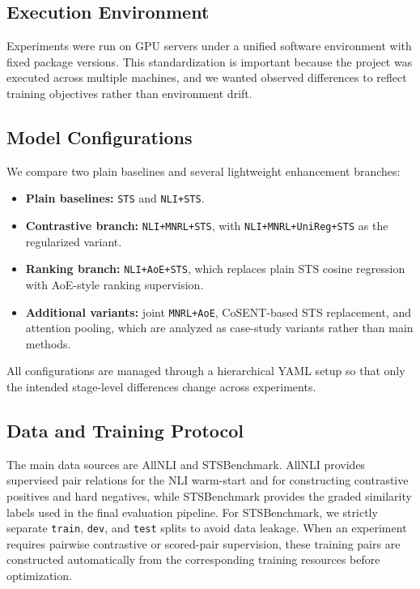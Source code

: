 \documentclass[letterpaper]{article} %
\begin{document}
\subsection{Execution Environment}
Experiments were run on GPU servers under a unified software environment with fixed package
versions. This standardization is important because the project was executed across multiple
machines, and we wanted observed differences to reflect training objectives rather than environment
drift.

\subsection{Model Configurations}
We compare two plain baselines and several lightweight enhancement branches:
\begin{itemize}[itemsep=0pt]
    \item \textbf{Plain baselines:} \texttt{STS} and \texttt{NLI+STS}.
    \item \textbf{Contrastive branch:} \texttt{NLI+MNRL+STS}, with \texttt{NLI+MNRL+UniReg+STS} as the regularized variant.
    \item \textbf{Ranking branch:} \texttt{NLI+AoE+STS}, which replaces plain STS cosine regression with AoE-style ranking supervision.
    \item \textbf{Additional variants:} joint \texttt{MNRL+AoE}, CoSENT-based STS replacement, and attention pooling, which are analyzed as case-study variants rather than main methods.
\end{itemize}
All configurations are managed through a hierarchical YAML setup so that only the intended stage-level
differences change across experiments.

\subsection{Data and Training Protocol}
The main data sources are AllNLI and STSBenchmark. AllNLI provides supervised pair relations for the
NLI warm-start and for constructing contrastive positives and hard negatives, while STSBenchmark
provides the graded similarity labels used in the final evaluation pipeline. For STSBenchmark, we
strictly separate \texttt{train}, \texttt{dev}, and \texttt{test} splits to avoid data leakage. When
an experiment requires pairwise contrastive or scored-pair supervision, these training pairs are
constructed automatically from the corresponding training resources before optimization.
\end{document}
